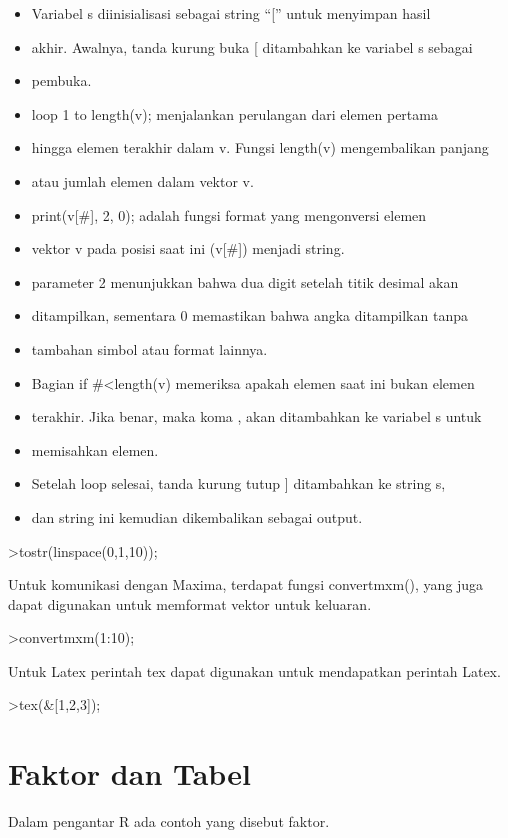 \documentclass[
]{book}
\begin{document}
\begin{itemize}
\item
  Variabel s diinisialisasi sebagai string ``{[}'' untuk menyimpan hasil
\item
  akhir. Awalnya, tanda kurung buka {[} ditambahkan ke variabel s sebagai
\item
  pembuka.
\item
  loop 1 to length(v); menjalankan perulangan dari elemen pertama
\item
  hingga elemen terakhir dalam v. Fungsi length(v) mengembalikan panjang
\item
  atau jumlah elemen dalam vektor v.
\item
  print(v{[}\#{]}, 2, 0); adalah fungsi format yang mengonversi elemen
\item
  vektor v pada posisi saat ini (v{[}\#{]}) menjadi string.
\item
  parameter 2 menunjukkan bahwa dua digit setelah titik desimal akan
\item
  ditampilkan, sementara 0 memastikan bahwa angka ditampilkan tanpa
\item
  tambahan simbol atau format lainnya.
\item
  Bagian if \#\textless length(v) memeriksa apakah elemen saat ini bukan elemen
\item
  terakhir. Jika benar, maka koma , akan ditambahkan ke variabel s untuk
\item
  memisahkan elemen.
\item
  Setelah loop selesai, tanda kurung tutup {]} ditambahkan ke string s,
\item
  dan string ini kemudian dikembalikan sebagai output.
\end{itemize}

\textgreater tostr(linspace(0,1,10));

Untuk komunikasi dengan Maxima, terdapat fungsi convertmxm(), yang juga dapat digunakan untuk memformat vektor untuk keluaran.

\textgreater convertmxm(1:10);

Untuk Latex perintah tex dapat digunakan untuk mendapatkan perintah Latex.

\textgreater tex(\&{[}1,2,3{]});

\chapter{Faktor dan Tabel}\label{faktor-dan-tabel}

Dalam pengantar R ada contoh yang disebut faktor.
\end{document}
